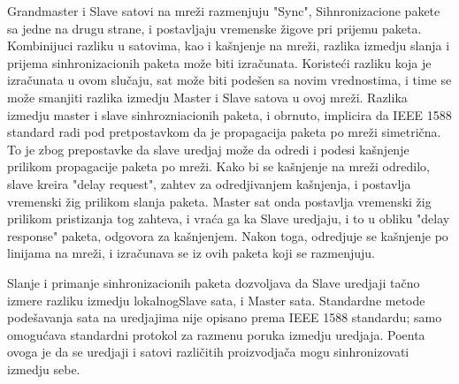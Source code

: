 \documentclass[a4paper,12pt, master]{etf}
\begin{document}
	Grandmaster i Slave satovi na mre\v{z}i razmenjuju "Sync", Sihnronizacione pakete sa jedne na 
	drugu strane, i postavljaju vremenske \v{z}igove pri prijemu paketa. Kombinijuci razliku u 
	satovima, kao i ka\v{s}njenje na mre\v{z}i, razlika izmedju slanja i prijema sinhronizacionih 
	paketa mo\v{z}e biti izra\v{c}unata. Koriste\'{c}i razliku koja je izra\v{c}unata u ovom slu\v{c}aju, sat 
	mo\v{z}e biti pode\v{s}en sa novim vrednostima, i time se mo\v{z}e smanjiti razlika izmedju Master i 
	Slave satova u ovoj mre\v{z}i. Razlika izmedju master i slave sinhrozniacionih paketa, i 
	obrnuto, implicira da IEEE 1588 standard radi pod pretpostavkom da je propagacija paketa 
	po mre\v{z}i simetri\v{c}na. To je zbog prepostavke da slave uredjaj mo\v{z}e da odredi i podesi 
	ka\v{s}njenje prilikom propagacije paketa po mre\v{z}i. Kako bi se ka\v{s}njenje na mre\v{z}i odredilo, 
	slave kreira "delay request", zahtev za odredjivanjem ka\v{s}njenja, i postavlja vremenski 
	\v{z}ig prilikom slanja paketa. Master sat onda postavlja vremenski \v{z}ig prilikom pristizanja 
	tog zahteva, i vra\'{c}a ga ka Slave uredjaju, i to u obliku "delay response" paketa, 
	odgovora za ka\v{s}njenjem. Nakon toga, odredjuje se ka\v{s}njenje po linijama na mre\v{z}i, i 
	izra\v{c}unava se iz ovih paketa koji se razmenjuju.
	
	Slanje i primanje sinhronizacionih paketa dozvoljava da Slave uredjaji ta\v{c}no izmere 
	razliku izmedju lokalnog\/Slave sata, i Master sata. Standardne metode pode\v{s}avanja sata na 
	uredjajima nije opisano prema IEEE 1588 standardu; samo omogu\'{c}ava standardni protokol za 
	razmenu poruka izmedju uredjaja. Poenta ovoga je da se uredjaji i satovi razli\v{c}itih 
	proizvodja\v{c}a mogu sinhronizovati izmedju sebe.
	
\end{document}
